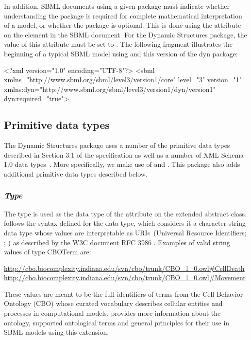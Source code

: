 In addition, SBML documents using a given package must indicate whether
understanding the package is required for complete mathematical
interpretation of a model, or whether the package is optional.  This is
done using the attribute  on the  element in
the SBML document.  For the Dynamic Structures package, the value of
this attribute must be set to .
The following fragment illustrates the beginning of a typical SBML model
using \sbmlthreecore and this version of the dyn package:

\begin{example}
<?xml version="1.0" encoding="UTF-8"?>
<sbml xmlns="http://www.sbml.org/sbml/level3/version1/core" level="3" version="1"
     xmlns:dyn="http://www.sbml.org/sbml/level3/version1/dyn/version1" dyn:required="true">
\end{example}

\subsection{Primitive data types}
\label{subsec:primitives}
The Dynamic Structures package uses a number of the primitive data types described in Section 3.1 of the \sbmlthreecore specification as well as a number of XML Schema 1.0 data types~\citep{biron:2000}. More specifically, we make use of  and . This package also adds additional primitive data types described below.

\subsubsection{\emph{Type} }
\label{dat:CBOTerm}

The type  is used as the data type of the attribute  on the extended \SBase abstract class.  follows the syntax defined for the  data type, which considers it a character string data type whose values are interpretable as URIs~(Universal Resource Identifiers; \citep{Means:2001}; \citep{w3c:2000b}) as described by the W3C document RFC 3986 \citep{Berners-Lee:2005}. Examples of valid string values of type CBOTerm are:  
\begin{center}
\url{http://cbo.biocomplexity.indiana.edu/svn/cbo/trunk/CBO_1_0.owl#CellDeath} \url{http://cbo.biocomplexity.indiana.edu/svn/cbo/trunk/CBO_1_0.owl#Movement}
\end{center}
These values are meant to be the full identifiers of terms from the Cell Behavior Ontology (CBO) whose curated vocabulary describes cellular entities and processes in computational models.  provides more information about the ontology, supported ontological terms and general principles for their use in SBML models using this extension.

